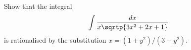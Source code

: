 Show that the integral
\[
\int \frac{dx}{x \sqrtp{3x^{2} + 2x + 1}}
\]
is rationalised by the substitution $x = (1 + y^{2})/(3 - y^{2})$. 

